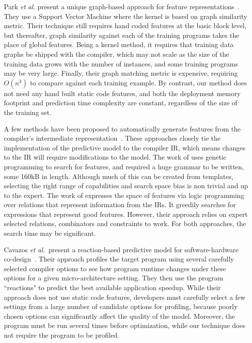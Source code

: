 Park \emph{et al.} present a unique graph-based approach for feature representations~\cite{Park2012}. They use a Support Vector Machine where the kernel is based on graph similarity metric. Their technique still requires hand coded features at the basic block level, but thereafter, graph similarity against each of the training programs takes the place of global features. Being a kernel method, it requires that training data graphs be shipped with the compiler, which may not scale as the size of the training data grows with the number of instances, and some training programs may be very large. Finally, their graph matching metric is expensive, requiring $O(n^3)$ to compare against each training example. By contrast, our method does not need any hand built static code features, and both the deployment memory footprint and prediction time complexity are constant, regardless of the size of the training set. 

A few methods have been proposed to automatically generate features from the compiler's intermediate representation~\cite{Namolaru2010a,Leather2014}. These approaches closely tie the implementation of the predictive model to the compiler IR, which means changes to the IR will require modifications to the model. The work of \cite{Leather2014} uses genetic programming to search for features, and required a huge grammar to be written, some 160kB in length. Although much of this can be created from templates, selecting the right range of capabilities and search space bias is non trivial and up to the expert. The work of \cite{Namolaru2010a} expresses the space of features via logic programming over relations that represent information from the IRs. It greedily searches for expressions that represent good features. However, their approach relies on expert selected relations, combinators and constraints to work. For both approaches, the search time may be significant.

Cavazos \emph{et al.\ }present a reaction-based predictive model for software-hardware co-design~\cite{Cavazos2006}. Their approach profiles the target program using several carefully selected compiler options to see how program runtime changes under these options for a given micro-architecture setting. They then use the program ``reactions" to predict the best available application speedup. While their approach does not use static code features, developers must carefully select a few settings from a large number of candidate options for profiling, because poorly chosen options can significantly affect the quality of the model. Moreover, the program must be run several times before optimization, while our technique does not require the program to be profiled.

